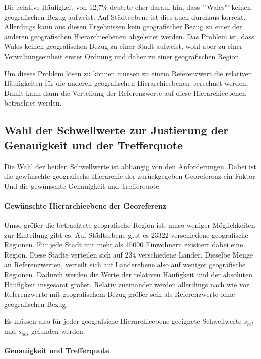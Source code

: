 			

			Die relative Häufigkeit von 12,7\% deutete eher darauf hin, dass "'Wales"' keinen geografischen Bezug aufweist.
			Auf Städteebene ist dies auch durchaus korrekt. 
			Allerdings kann aus diesen Ergebnissen kein geografischer Bezug zu einer der anderen geografischen Hierarchieebenen abgeleitet werden.
			Das Problem ist, dass Wales keinen geografischen Bezug zu einer Stadt aufweist, wohl aber zu einer Verwaltungseinheit erster Ordnung und daher zu einer geografischen Region. 

			Um dieses Problem lösen zu können müssen zu einem Referenzwert die relativen Häufigkeiten für die anderen geografischen Hierarchieebenen berechnet werden.
			Damit kann dann die Verteilung der Referenzwerte auf diese Hierarchieebenen betrachtet werden.

		\subsection{Wahl der Schwellwerte zur Justierung der Genauigkeit und der Trefferquote}

			Die Wahl der beiden Schwellwerte ist abhängig von den Anforderungen.
			Dabei ist die gewünschte geografische Hierarchie der zurückgegeben Georeferenz ein Faktor.
			Und die gewünschte Genauigkeit und Trefferquote.
			
			\paragraph{Gewünschte Hierarchieebene der Georeferenz}

				Umso größer die betrachtete geografische Region ist, umso weniger Möglichkeiten zur Einteilung gibt es.
				Auf Städteebene gibt es 23322 verschiedene geografische Regionen. 
				Für jede Stadt mit mehr als 15000 Einwohnern existiert dabei eine Region.
				Diese Städte verteilen sich auf 234 verschiedene Länder.
				Dieselbe Menge an Referenzwerten, verteilt sich auf Länderebene also auf weniger geografische Regionen. 
				Dadurch werden die Werte der relativen Häufigkeit und der absoluten Häufigkeit insgesamt größer.
				Relativ zueinander werden allerdings nach wie vor Referenzwerte mit geografischem Bezug größer sein als Referenzwerte ohne geografischen Bezug.

				Es müssen also für jeder geografsiche Hierarchieebene geeignete Schwellwerte $s_{rel}$ und $s_{abs}$ gefunden werden.

			\paragraph{Genauigkeit und Trefferquote} 

